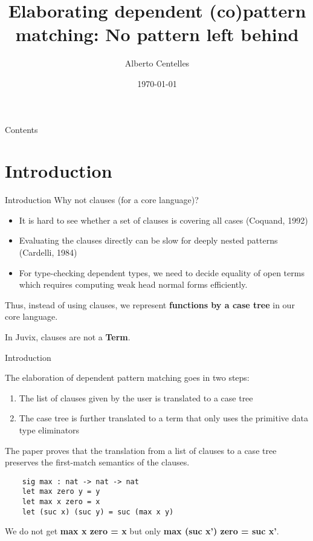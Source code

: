 \documentclass[10pt, xelatex, hyperref={pdfpagelabels=false,breaklinks}]{beamer}
\title[TS]{Elaborating dependent (co)pattern matching: No pattern left behind}
\date{\today}
\author[Alberto Centelles]{Alberto Centelles}
\institute{heliaxdev/plt}
\begin{document}
\setcounter{page}{1}

\begin{frame}[plain]
\titlepage
\end{frame}


\begin{frame}{Contents}
\tableofcontents
\end{frame}

\section{Introduction}
\begin{frame}[fragile]{Introduction}
  Why not clauses (for a core language)?
  \begin{itemize}
    \item It is hard to see whether a set of clauses is covering all cases (Coquand, 1992) 
    \item Evaluating the clauses directly can be slow for deeply nested patterns (Cardelli, 1984)
    \item For type-checking dependent types, we need to decide equality of open terms which requires computing weak head normal forms efficiently.
  \end{itemize}

  Thus, instead of using clauses, we represent \textbf{functions by a case tree} in our core language.

  In Juvix, clauses are not a \textbf{Term}.
\end{frame}

\begin{frame}[fragile]{Introduction}
  

  The elaboration of dependent pattern matching goes in two steps:
   \begin{enumerate}
     \item The list of clauses given by the user is translated to a case tree
     \item The case tree is further translated to a term that only uses the primitive data type eliminators
   \end{enumerate}

  The paper proves that the translation from a list of clauses to a case tree preserves the first-match semantics of the clauses.
  \begin{verbatim}
    sig max : nat -> nat -> nat
    let max zero y = y
    let max x zero = x
    let (suc x) (suc y) = suc (max x y)
  \end{verbatim}
  We do not get \textbf{max x zero = x} but only \textbf{max (suc x') zero = suc x'}.

\end{frame}
\end{document}
